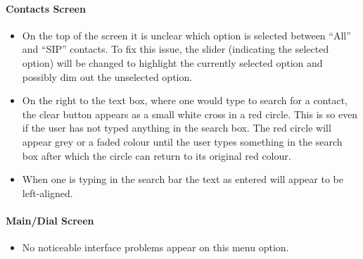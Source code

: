 \documentclass[11pt]{article}
\begin{document}
\paragraph{Contacts Screen}
\begin{itemize}
\item On the top of the screen it is unclear which option is selected between \enquote{All} and \enquote{SIP} contacts. To fix this issue, the slider (indicating the selected option) will be changed to highlight the currently selected option and possibly dim out the unselected option.

\item On the right to the text box, where one would type to search for a contact, the clear button appears as a small white cross in a red circle. This is so even if the user has not typed anything in the search box. The red circle will appear grey or a faded colour until the user types something in the search box after which the circle can return to its original red colour. 

\item When one is typing in the search bar the text as entered will appear to be left-aligned.
\end{itemize}

\paragraph{Main/Dial Screen}
\begin{itemize}
\item No noticeable interface problems appear on this menu option.
\end{itemize}
\end{document}
